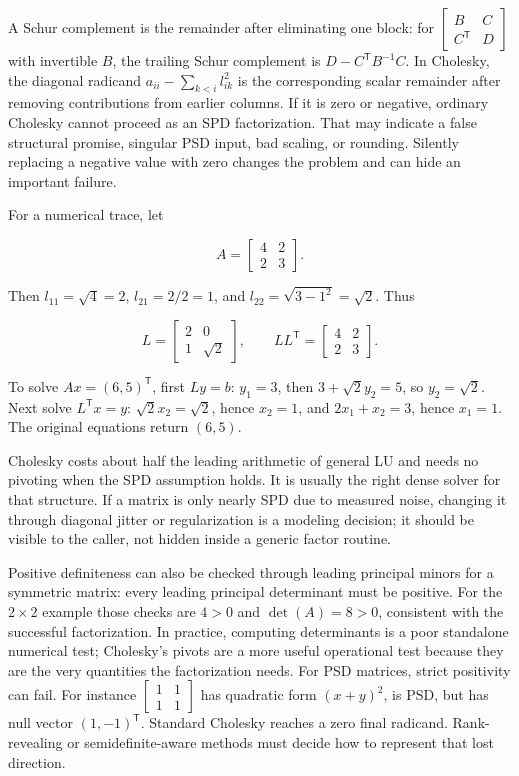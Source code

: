 A Schur complement is the remainder after eliminating one block: for \(\begin{bmatrix}B&C\\C^\mathsf T&D\end{bmatrix}\) with invertible \(B\), the trailing Schur complement is \(D-C^\mathsf TB^{-1}C\). In Cholesky, the diagonal radicand \(a_{ii}-\sum_{k<i}l_{ik}^2\) is the corresponding scalar remainder after removing contributions from earlier columns. If it is zero or negative, ordinary Cholesky cannot proceed as an SPD factorization. That may indicate a false structural promise, singular PSD input, bad scaling, or rounding. Silently replacing a negative value with zero changes the problem and can hide an important failure.

For a numerical trace, let

\[
A=\begin{bmatrix}4&2\\2&3\end{bmatrix}.
\]

Then \(l_{11}=\sqrt4=2\), \(l_{21}=2/2=1\), and \(l_{22}=\sqrt{3-1^2}=\sqrt2\). Thus

\[
L=\begin{bmatrix}2&0\\1&\sqrt2\end{bmatrix},\qquad
LL^\mathsf T=\begin{bmatrix}4&2\\2&3\end{bmatrix}.
\]

To solve \(Ax=(6,5)^\mathsf T\), first \(Ly=b\): \(y_1=3\), then \(3+\sqrt2y_2=5\), so \(y_2=\sqrt2\). Next solve \(L^\mathsf Tx=y\): \(\sqrt2x_2=\sqrt2\), hence \(x_2=1\), and \(2x_1+x_2=3\), hence \(x_1=1\). The original equations return \((6,5)\).

Cholesky costs about half the leading arithmetic of general LU and needs no pivoting when the SPD assumption holds. It is usually the right dense solver for that structure. If a matrix is only nearly SPD due to measured noise, changing it through diagonal jitter or regularization is a modeling decision; it should be visible to the caller, not hidden inside a generic factor routine.

Positive definiteness can also be checked through leading principal minors for a symmetric matrix: every leading principal determinant must be positive. For the \(2\times2\) example those checks are \(4>0\) and \(\det(A)=8>0\), consistent with the successful factorization. In practice, computing determinants is a poor standalone numerical test; Cholesky's pivots are a more useful operational test because they are the very quantities the factorization needs. For PSD matrices, strict positivity can fail. For instance \(\begin{bmatrix}1&1\\1&1\end{bmatrix}\) has quadratic form \((x+y)^2\), is PSD, but has null vector \((1,-1)^\mathsf T\). Standard Cholesky reaches a zero final radicand. Rank-revealing or semidefinite-aware methods must decide how to represent that lost direction.


